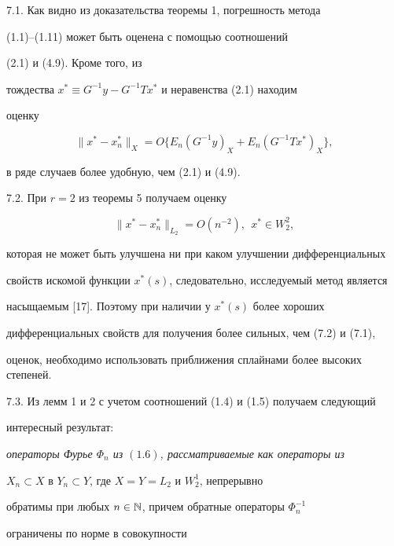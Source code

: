 7.1. Как видно из доказательства теоремы 1, погрешность метода


(1.1)--(1.11) может быть оценена с помощью соотношений


(2.1) и (4.9). Кроме того, из


тождества $x^* \equiv G^{-1}y-G^{-1}Tx^*$ и неравенства (2.1) находим


оценку


\begin{equation}


\|x^*-x^*_n\|_X=O\{E_n(G^{-1}y)_X+E_n(G^{-1}Tx^*)_X\},


\end{equation}


в ряде случаев более удобную, чем (2.1) и (4.9).


\smallskip





7.2. При $r=2$ из теоремы 5 получаем оценку


\begin{equation}


\|x^*-x^*_n\|_{L_2}=O(n^{-2}),\ \ x^*\in W_2^2,


\end{equation}


которая не может быть улучшена ни при каком улучшении дифференциальных


свойств искомой функции $x^*(s)$, следовательно, исследуемый метод является


насыщаемым [17]. Поэтому при наличии у $x^*(s)$ более хороших


дифференциальных свойств для получения более сильных, чем (7.2) и (7.1),


оценок, необходимо использовать приближения сплайнами более высоких степеней.


\smallskip





7.3. Из лемм 1 и 2 с учетом соотношений (1.4) и (1.5) получаем следующий


интересный результат:





{\it операторы Фурье $\Phi_n$ из $(1.6)$, рассматриваемые как операторы из


$X_n \subset X$ в $Y_n \subset Y$, где $X=Y=L_2$ и $W_2^1$, непрерывно


обратимы при любых $n \in \Bbb N$, причем обратные операторы $\Phi_n^{-1}$


ограничены по норме в совокупности}


